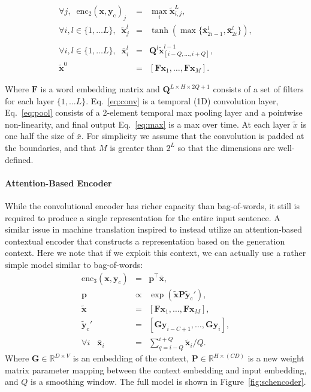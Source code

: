 \documentclass[11pt,a4paper]{article}
\newcommand{\enc}{\mathrm{enc}}
\newcommand{\xvec}{\mathbf{x}}
\newcommand{\yvec}{\mathbf{y}}
\newcommand{\context}{\mathbf{y}_{\mathrm{c}}}
\newcommand{\embcontext}{\mathbf{\tilde{y}}_{\mathrm{c}}}
\newcommand{\inpcontext}{\mathbf{\tilde{x}}}
\newcommand{\Gvec}{\mathbf{G}}
\newcommand{\Fvec}{\mathbf{F}}
\newcommand{\Pvec}{\mathbf{P}}
\newcommand{\reals}{\mathbb{R}}
\begin{document}
\begin{small}
\begin{eqnarray}
\forall j, \;\; \enc_2(\xvec, \context)_j &=& \max_{i} \tilde{\xvec}^{L}_{i,j} , \label{eq:max}  \\
 \forall i, l\in \{1,\ldots L\}, \;\; \tilde{\xvec}_{j}^{l} &=& \tanh ( \max \{ \bar{\xvec}^{l}_{2i-1}, \bar{\xvec}^{l}_{2i} \} ), \nonumber \\ \label{eq:pool} \\ 
 \forall i, l \in \{1,\ldots L\}, \;\; \bar{\xvec}_i^{l} &=&  \mathbf{Q}^{l} \inpcontext^{l-1}_{[i-Q, \ldots, i +Q]} , \label{eq:conv} \\ 
 \inpcontext^{0} &=& [\Fvec \xvec_1, \dots, \Fvec \xvec_{M}].  
\end{eqnarray}
\end{small}
Where $\mathbf{F}$ is a word embedding matrix and $\mathbf{Q}^{L\times
  H \times 2Q +1 }$ consists of a set of filters for each layer $\{1,
\ldots L\}$.  Eq.~\ref{eq:conv} is a temporal (1D) convolution layer,
Eq.~\ref{eq:pool} consists of a 2-element temporal max pooling layer
and a pointwise non-linearity, and final output Eq.~\ref{eq:max} is a
max over time. At each layer $\tilde{x}$ is one half the size of
$\bar{x}$. For simplicity we assume that the convolution is padded at
the boundaries, and that $M$ is greater than $2^L$ so that the
dimensions are well-defined. 

\paragraph{Attention-Based Encoder}

While the convolutional encoder has richer capacity than bag-of-words, it
still is required to produce a single representation for the entire
input sentence. A similar issue in machine translation inspired 
 to instead utilize an attention-based 
contextual encoder that constructs a representation based on the 
generation context. Here we note that if we exploit this context, we 
can actually use a rather simple model similar to bag-of-words:
\begin{eqnarray*}
 \enc_3(\xvec, \context) &=& \mathbf{p}^\top \bar{\xvec},    \\
 \mathbf{p} & \propto  & \exp(\inpcontext  \Pvec \embcontext' ),   \\ 
 \inpcontext &=& [\Fvec \xvec_1, \dots, \Fvec \xvec_{M}],  \\ 
  \mathbf{\embcontext'} &=& [\Gvec \yvec_{i-C + 1}, \dots,\Gvec \yvec_{i}], \\ 
 \forall i \;\;\; \bar{\xvec}_i &=& \sum_{q=i-Q}^{i+Q}  \inpcontext_{i} / Q.
\end{eqnarray*}
\noindent Where $\Gvec \in \reals^{D \times V}$ is an embedding of the
context, $\Pvec \in \reals^{H \times (C D)}$ is a new weight matrix parameter mapping
between the context embedding and input embedding, and $Q$ is a
smoothing window. The full model is shown in Figure~\ref{fig:schencoder}.
\end{document}
